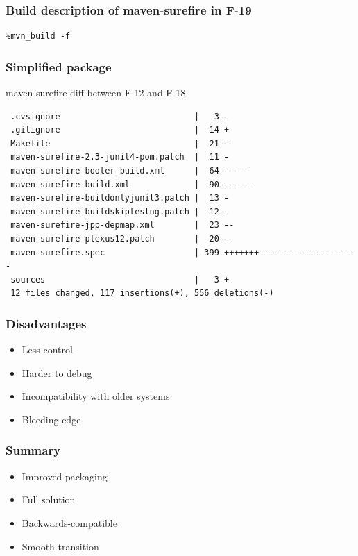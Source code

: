 \documentclass[pdftex,unicode,xcolor=table]{beamer}
\begin{document}
\begin{frame}[fragile]
  \frametitle{Build description of maven-surefire in F-19}
  \scriptsize
  \begin{verbatim}
%mvn_build -f
  \end{verbatim}
\end{frame}


\begin{frame}[fragile]
  \frametitle{Simplified package}
  \begin{block}{maven-surefire diff between F-12 and F-18}
    \scriptsize
\begin{verbatim}
 .cvsignore                           |   3 -
 .gitignore                           |  14 +
 Makefile                             |  21 --
 maven-surefire-2.3-junit4-pom.patch  |  11 -
 maven-surefire-booter-build.xml      |  64 -----
 maven-surefire-build.xml             |  90 ------
 maven-surefire-buildonlyjunit3.patch |  13 -
 maven-surefire-buildskiptestng.patch |  12 -
 maven-surefire-jpp-depmap.xml        |  23 --
 maven-surefire-plexus12.patch        |  20 --
 maven-surefire.spec                  | 399 +++++++--------------------
 sources                              |   3 +-
 12 files changed, 117 insertions(+), 556 deletions(-)
\end{verbatim}
  \end{block}
\end{frame}

\begin{frame}
  \frametitle{Disadvantages}
  \begin{itemize}
    \item Less control
    \item Harder to debug
    \item Incompatibility with older systems
    \item Bleeding edge
  \end{itemize}
\end{frame}

\begin{frame}
  \frametitle{Summary}
  \begin{itemize}
    \item Improved packaging
    \item Full solution
    \item Backwards-compatible
    \item Smooth transition
  \end{itemize}
\end{frame}
\end{document}
